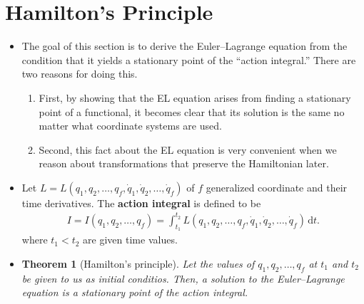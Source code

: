 \documentclass[10pt]{article}
\newtheorem{theorem}[lemma]{Theorem}
\newcommand{\dee}{\mathrm{d}}
\begin{document}
  \section{Hamilton's Principle}

  \begin{itemize}
  	\item The goal of this section is to derive the Euler--Lagrange equation from the condition that it yields a stationary point of the ``action integral.'' There are two reasons for doing this.
  	\begin{enumerate}
  		\item First, by showing that the EL equation arises from finding a stationary point of a functional, it becomes clear that its solution is the same no matter what coordinate systems are used.

  		\item Second, this fact about the EL equation is very convenient when we reason about transformations that preserve the Hamiltonian later.
  	\end{enumerate}

  	\item Let $L = L(q_1, q_2, \dots, q_f, \dot{q}_1, \dot{q}_2, \dotsc, \dot{q}_f)$ of $f$ generalized coordinate and their time derivatives. The {\bf action integral} is defined to be
  	\begin{align*}
  		I = I(q_1, q_2, \dots, q_f) = \int_{t_1}^{t_2} L(q_1, q_2, \dots, q_f, \dot{q}_1, \dot{q}_2, \dotsc, \dot{q}_f)\, \dee t.
  	\end{align*}
  	where $t_1 < t_2$ are given time values. 

  	\item \begin{theorem}[Hamilton's principle] Let the values of $q_1, q_2, \dotsc, q_f$ at $t_1$ and $t_2$ be given to us as initial conditios. Then, a solution to the Euler--Lagrange equation is a stationary point of the action integral.
  	\end{theorem}


\end{itemize}
\end{document}
